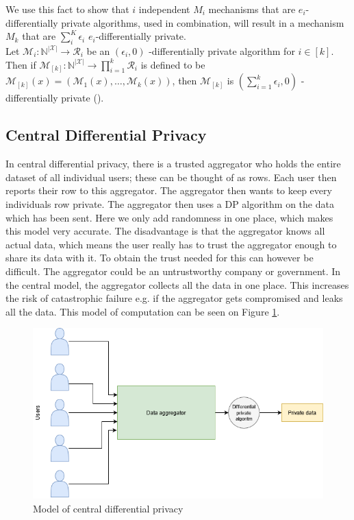 \documentclass[11pt]{article}
\theoremstyle{definition}
\begin{document}
We use this fact to show that $i$ independent $M_i$ mechanisms that are $e_i$-differentially private algorithms, used in combination, will result in a mechanism $M_k$ that are  $\sum_i^K\epsilon_i$ $e_i$-differentially private.\\ Let $\mathcal{M}_{i}: \mathbb{N}^{|\mathcal{X}|} \rightarrow \mathcal{R}_{i}$ be an $\left(\epsilon_{i}, 0\right)$ -differentially private algorithm for $i \in[k]$. Then if $\mathcal{M}_{[k]}: \mathbb{N}^{|\mathcal{X}|} \rightarrow \prod_{i=1}^{k} \mathcal{R}_{i}$ is defined to be $\mathcal{M}_{[k]}(x)=\left(\mathcal{M}_{1}(x), \ldots, \mathcal{M}_{k}(x)\right)$, then $\mathcal{M}_{[k]}$ is $\left(\sum_{i=1}^{k} \epsilon_{i}, 0\right)$ -differentially private (\cite[42]{algo_fun}).

\subsection{Central Differential Privacy}
In central differential privacy, there is a trusted aggregator who holds the entire dataset of all individual users; these can be thought of as rows. Each user then reports their row to this aggregator. The aggregator then wants to keep every individuals row private. The aggregator then uses a DP algorithm on the data which has been sent. Here we only add randomness in one place, which makes this model very accurate. The disadvantage is that the aggregator knows all actual data, which means the user really has to trust the aggregator enough to share its data with it. To obtain the trust needed for this can however be difficult. The aggregator could be an untrustworthy company or government. In the central model, the aggregator collects all the data in one place. This increases the risk of catastrophic failure e.g. if the aggregator gets compromised and leaks all the data.
This model of computation can be seen on Figure \ref{fig:model_cen_dp}.
\begin{figure}[H]
    \centering
    \includegraphics[width = .8\textwidth]{figures/DP_cen.png}
    \caption{Model of central differential privacy}
    \label{fig:model_cen_dp}
\end{figure}
\end{document}
